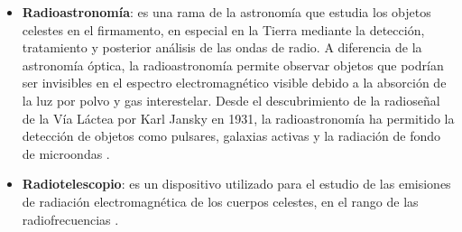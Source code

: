 
\begin{itemize}
    \item \textbf{Radioastronomía}: es una rama de la astronomía que estudia los objetos celestes
    en el firmamento, en especial en la Tierra mediante la detección, tratamiento
    y posterior análisis de las ondas de radio.
    A diferencia de la astronomía óptica, la radioastronomía permite observar
    objetos que podrían ser invisibles en el espectro electromagnético visible
    debido a la absorción de la luz por polvo y gas interestelar. Desde el
    descubrimiento de la radioseñal de la Vía Láctea por Karl Jansky en 1931, la
    radioastronomía ha permitido la detección de objetos como pulsares, galaxias
    activas y la radiación de fondo de microondas \cite{wilson2013radioastronomy}.

    \item \textbf{Radiotelescopio}: es un dispositivo utilizado para el estudio de las emisiones de
    radiación electromagnética de los cuerpos celestes, en el rango de las radiofrecuencias 
    \cite{ordonez2018radiotelescopio}.
\end{itemize}



